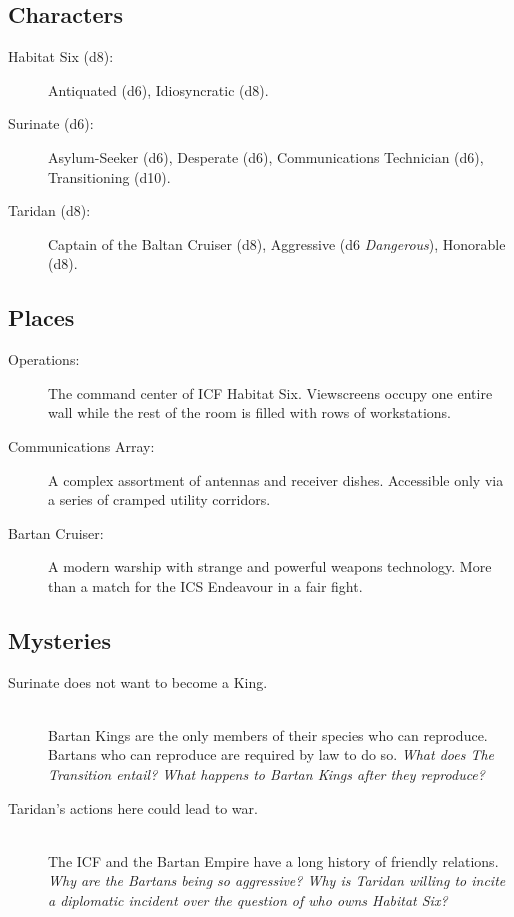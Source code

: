 \documentclass[11pt, a5paper, parskip=half-, DIV=12]{scrartcl}
\begin{document}
\newpage

\subsection*{Characters}
\begin{description}
	\item[Habitat Six (d8):] Antiquated (d6), Idiosyncratic (d8). 
	\item[Surinate (d6):] Asylum-Seeker (d6), Desperate (d6), Communications Technician (d6), Transitioning (d10).
	\item[Taridan (d8):] Captain of the Baltan Cruiser (d8), Aggressive (d6 \textit{Dangerous}), Honorable (d8).
\end{description}

\subsection*{Places}
\begin{description}
	\item[Operations:] The command center of ICF Habitat Six. Viewscreens occupy one entire wall while the rest of the room is filled with rows of workstations.
	\item[Communications Array:] A complex assortment of antennas and receiver dishes. Accessible only via a series of cramped utility corridors.
	\item[Bartan Cruiser:] A modern warship with strange and powerful weapons technology. More than a match for the ICS Endeavour in a fair fight.
\end{description}

\subsection*{Mysteries}
\begin{description}
	\item[Surinate does not want to become a King.]\phantom{a}\\ Bartan Kings are the only members of their species who can reproduce. Bartans who can reproduce are required by law to do so. \textit{ What does The Transition entail? What happens to Bartan Kings after they reproduce?}

	\item[Taridan's actions here could lead to war.]\phantom{a}\\
	The ICF and the Bartan Empire have a long history of friendly relations. \textit{Why are the Bartans being so aggressive? Why is Taridan willing to incite a diplomatic incident over the question of who owns Habitat Six?}
\end{description}
\end{document}
